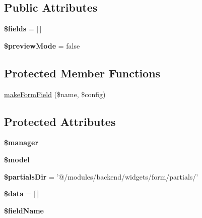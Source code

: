 \subsection*{Public Attributes}
\begin{DoxyCompactItemize}
\item 
\hypertarget{classDMA_1_1Friends_1_1Classes_1_1ActivityForm_ab9f1445590940a3564581d3481b942c5}{{\bfseries \$fields} = \mbox{[}$\,$\mbox{]}}\label{classDMA_1_1Friends_1_1Classes_1_1ActivityForm_ab9f1445590940a3564581d3481b942c5}

\item 
\hypertarget{classDMA_1_1Friends_1_1Classes_1_1ActivityForm_ac7ba33a73e3e8269a24e2b1b37b8778a}{{\bfseries \$preview\+Mode} = false}\label{classDMA_1_1Friends_1_1Classes_1_1ActivityForm_ac7ba33a73e3e8269a24e2b1b37b8778a}

\end{DoxyCompactItemize}
\subsection*{Protected Member Functions}
\begin{DoxyCompactItemize}
\item 
\hyperlink{classDMA_1_1Friends_1_1Classes_1_1ActivityForm_a8e64eb3aac3a88edbbc67700f40f7f61}{make\+Form\+Field} (\$name, \$config)
\end{DoxyCompactItemize}
\subsection*{Protected Attributes}
\begin{DoxyCompactItemize}
\item 
\hypertarget{classDMA_1_1Friends_1_1Classes_1_1ActivityForm_a6625f7f805756ad348523c8efc7eaba2}{{\bfseries \$manager}}\label{classDMA_1_1Friends_1_1Classes_1_1ActivityForm_a6625f7f805756ad348523c8efc7eaba2}

\item 
\hypertarget{classDMA_1_1Friends_1_1Classes_1_1ActivityForm_afa057e497b595e91ff28b7d82d453a19}{{\bfseries \$model}}\label{classDMA_1_1Friends_1_1Classes_1_1ActivityForm_afa057e497b595e91ff28b7d82d453a19}

\item 
\hypertarget{classDMA_1_1Friends_1_1Classes_1_1ActivityForm_a661164febcd7fafdb40b95f4fceb0539}{{\bfseries \$partials\+Dir} = '@/modules/backend/widgets/form/partials/'}\label{classDMA_1_1Friends_1_1Classes_1_1ActivityForm_a661164febcd7fafdb40b95f4fceb0539}

\item 
\hypertarget{classDMA_1_1Friends_1_1Classes_1_1ActivityForm_a7bba50ae9e6c7fe7fd5cbaa8dcf7a976}{{\bfseries \$data} = \mbox{[}$\,$\mbox{]}}\label{classDMA_1_1Friends_1_1Classes_1_1ActivityForm_a7bba50ae9e6c7fe7fd5cbaa8dcf7a976}

\item 
\hypertarget{classDMA_1_1Friends_1_1Classes_1_1ActivityForm_ae59dff70c79843060bc487578fae0846}{{\bfseries \$field\+Name}}\label{classDMA_1_1Friends_1_1Classes_1_1ActivityForm_ae59dff70c79843060bc487578fae0846}

\end{DoxyCompactItemize}


